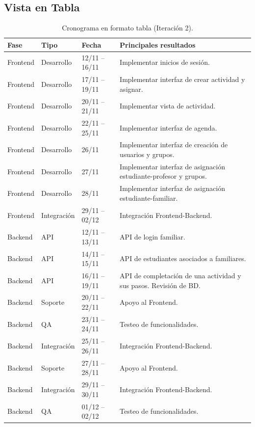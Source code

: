 \subsection{Vista en Tabla}

\begin{table}[H]
\centering
\small
\begin{tabularx}{\textwidth}{l l l X}
\toprule
\textbf{Fase} & \textbf{Tipo} & \textbf{Fecha} & \textbf{Principales resultados} \\
\midrule
Frontend & Desarrollo & 12/11 -- 16/11 & Implementar inicios de sesión. \\
Frontend & Desarrollo & 17/11 -- 19/11 & Implementar interfaz de crear actividad y asignar. \\
Frontend & Desarrollo & 20/11 -- 21/11 & Implementar vista de actividad. \\
Frontend & Desarrollo & 22/11 -- 25/11 & Implementar interfaz de agenda. \\
Frontend & Desarrollo & 26/11 & Implementar interfaz de creación de usuarios y grupos. \\
Frontend & Desarrollo & 27/11 & Implementar interfaz de asignación estudiante-profesor y grupos. \\
Frontend & Desarrollo & 28/11 & Implementar interfaz de asignación estudiante-familiar. \\
Frontend & Integración & 29/11 -- 02/12 & Integración Frontend-Backend. \\
\midrule
Backend & API & 12/11 -- 13/11 & API de login familiar. \\
Backend & API & 14/11 -- 15/11 & API de estudiantes asociados a familiares. \\
Backend & API & 16/11 -- 19/11 & API de completación de una actividad y sus pasos. Revisión de BD. \\
Backend & Soporte & 20/11 -- 22/11 & Apoyo al Frontend. \\
Backend & QA & 23/11 -- 24/11 & Testeo de funcionalidades. \\
Backend & Integración & 25/11 -- 26/11 & Integración Frontend-Backend. \\
Backend & Soporte & 27/11 -- 28/11 & Apoyo al Frontend. \\
Backend & Integración & 29/11 -- 30/11 & Integración Frontend-Backend. \\
Backend & QA & 01/12 -- 02/12 & Testeo de funcionalidades. \\
\bottomrule
\end{tabularx}
\caption{Cronograma en formato tabla (Iteración 2).}
\label{tab:cronograma-tabla}
\end{table}

